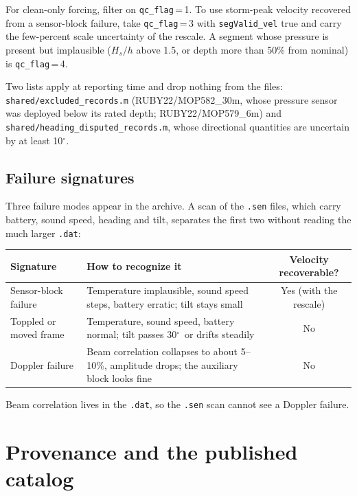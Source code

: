 \documentclass[11pt]{article}
\newcommand{\code}[1]{\texttt{#1}}
\newcommand{\qcflag}[1]{\texttt{qc\_flag}\,=\,#1}
\providecommand{\degree}{\ensuremath{^{\circ}}}
\begin{document}
\noindent
For clean-only forcing, filter on \qcflag{1}. To use storm-peak velocity recovered from a
sensor-block failure, take \qcflag{3} with \code{segValid\_vel} true and carry the few-percent
scale uncertainty of the rescale. A segment whose pressure is present but implausible ($H_s/h$
above 1.5, or depth more than 50\% from nominal) is \qcflag{4}.

Two lists apply at reporting time and drop nothing from the files:
\code{shared/excluded\_records.m} (RUBY22/MOP582\_30m, whose pressure sensor was deployed below
its rated depth; RUBY22/MOP579\_6m) and \code{shared/heading\_disputed\_records.m}, whose
directional quantities are uncertain by at least 10\degree.

\subsection{Failure signatures}
\label{sec:signatures}

Three failure modes appear in the archive. A scan of the \code{.sen} files, which carry battery,
sound speed, heading and tilt, separates the first two without reading the much larger
\code{.dat}:

\begin{center}
\begin{tabular}{@{}l p{7.5cm} c@{}}
\toprule
Signature & How to recognize it & Velocity recoverable? \\
\midrule
Sensor-block failure & Temperature implausible, sound speed steps, battery erratic; tilt stays
  small & Yes (with the rescale) \\
Toppled or moved frame & Temperature, sound speed, battery normal; tilt passes 30\degree\ or
  drifts steadily & No \\
Doppler failure & Beam correlation collapses to about 5--10\%, amplitude drops; the auxiliary
  block looks fine & No \\
\bottomrule
\end{tabular}
\end{center}

\noindent
Beam correlation lives in the \code{.dat}, so the \code{.sen} scan cannot see a Doppler failure.

\section{Provenance and the published catalog}
\label{sec:prov}
\end{document}

